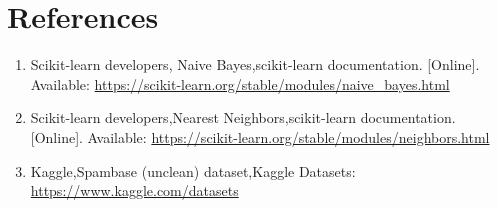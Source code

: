 \documentclass[12pt,a4paper]{article}
\begin{document}
\section{References}
\begin{enumerate}

\item Scikit-learn developers, Naive Bayes,scikit-learn documentation. [Online]. Available: \url{https://scikit-learn.org/stable/modules/naive_bayes.html}
\item Scikit-learn developers,Nearest Neighbors,scikit-learn documentation. [Online]. Available: \url{https://scikit-learn.org/stable/modules/neighbors.html}
\item Kaggle,Spambase (unclean) dataset,Kaggle Datasets: \url{https://www.kaggle.com/datasets}
\end{enumerate}
\end{document}
